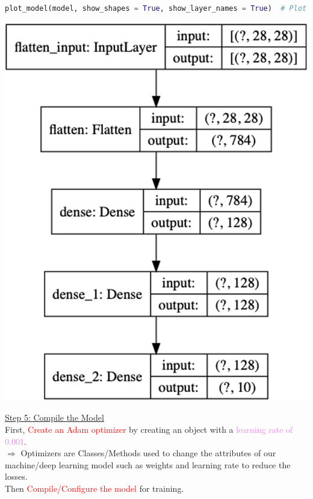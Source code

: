 \documentclass{book}
\begin{document}
\newpage
\begin{lstlisting}[language=Python, basicstyle=\ttfamily\small, keywordstyle=\color{blue}, commentstyle=\color{forestgreen}, stringstyle=\color{red}, showstringspaces=false]
plot_model(model, show_shapes = True, show_layer_names = True)  # Plot the model
\end{lstlisting}
\begin{center}
    \includegraphics[scale=0.25]{chapter 7/ch7_figure16.jpeg}
\end{center}
\uline{Step 5: Compile the Model}\\
\vspace{1mm}
First, \textcolor{red}{Create an Adam optimizer} by creating an object with a \textcolor{violet}{learning rate of 0.001}.\\
$\Rightarrow$ Optimizers are Classes/Methods used to change the attributes of our machine/deep learning model such as weights and learning rate to reduce the losses.\\
Then \textcolor{red}{Compile/Configure the model} for training.\\
\end{document}
